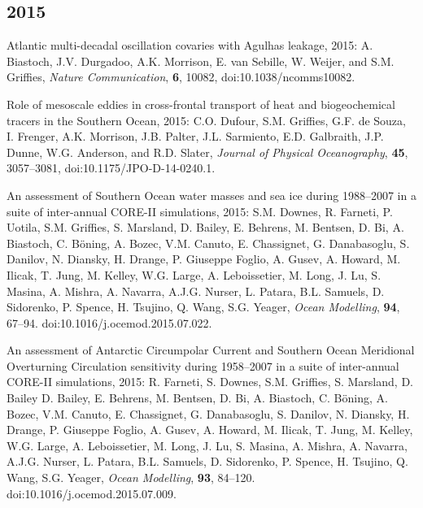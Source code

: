 \begin{etaremune}
\subsection*{\sc \color{Maroon} 2015}

\item Atlantic multi-decadal oscillation covaries with Agulhas leakage, 2015: A. Biastoch, J.V. Durgadoo, A.K. Morrison, E. van Sebille, W. Weijer, and S.M. Grif\/f\/ies, {\it Nature Communication}, {\bf 6}, 10082, doi:10.1038/ncomms10082.

\item Role of mesoscale eddies in cross-frontal transport of heat and biogeochemical tracers in the Southern Ocean, 2015: C.O. Dufour, S.M. Grif\/f\/ies, G.F. de Souza, I. Frenger, A.K. Morrison, J.B. Palter, J.L. Sarmiento, E.D. Galbraith, J.P. Dunne, W.G. Anderson, and R.D. Slater, {\it Journal of Physical Oceanography}, {\bf 45}, 3057--3081,
doi:10.1175/JPO-D-14-0240.1.

\item An assessment of Southern Ocean water masses and sea ice during  1988--2007 in a suite of inter-annual CORE-II simulations, 2015:  S.M. Downes, R. Farneti, P. Uotila, S.M. Grif\/f\/ies,  S. Marsland, D. Bailey, E. Behrens, M. Bentsen, D. Bi, A. Biastoch,  C. B\"oning, A. Bozec, V.M. Canuto, E. Chassignet, G. Danabasoglu,
  S. Danilov, N. Diansky, H. Drange, P. Giuseppe Foglio, A. Gusev,  A. Howard, M. Ilicak, T.  Jung, M. Kelley, W.G. Large,  A. Leboissetier, M. Long, J. Lu, S. Masina, A. Mishra, A. Navarra,  A.J.G. Nurser, L. Patara, B.L. Samuels, D. Sidorenko, P. Spence,
  H. Tsujino, Q. Wang, S.G. Yeager, {\it Ocean Modelling}, {\bf 94},  67--94.  doi:10.1016/j.ocemod.2015.07.022.



\item An assessment of Antarctic Circumpolar Current and Southern  Ocean Meridional Overturning Circulation sensitivity during  1958--2007 in a suite of inter-annual CORE-II simulations, 2015:
  R. Farneti, S. Downes, S.M. Grif\/f\/ies, S. Marsland,
  D. Bailey D. Bailey, E. Behrens, M. Bentsen, D. Bi, A. Biastoch,  C. B\"oning, A. Bozec, V.M. Canuto, E. Chassignet, G. Danabasoglu,  S. Danilov, N. Diansky, H. Drange, P. Giuseppe Foglio, A. Gusev,  A. Howard, M. Ilicak, T.  Jung, M. Kelley, W.G. Large,
  A. Leboissetier, M. Long, J. Lu, S. Masina, A. Mishra, A. Navarra,  A.J.G. Nurser, L. Patara, B.L. Samuels, D. Sidorenko, P. Spence,  H. Tsujino, Q. Wang, S.G. Yeager, {\it Ocean Modelling}, {\bf 93},
  84--120. doi:10.1016/j.ocemod.2015.07.009.


\end{etaremune}

